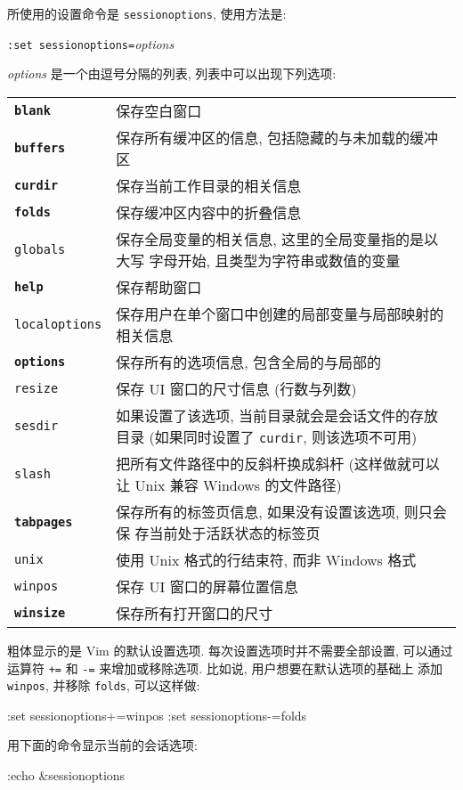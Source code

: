 所使用的设置命令是 \texttt{sessionoptions}, 使用方法是:
\begin{vimcmdform}
\texttt{:set sessionoptions=}\textit{options}
\end{vimcmdform}
\textit{options} 是一个由逗号分隔的列表, 列表中可以出现下列选项:
\begin{center}
    \begin{tabular}{lp{35em}}
        \hline
        \textbf{\texttt{blank}}  & 保存空白窗口 \\
        \textbf{\texttt{buffers}} & 保存所有缓冲区的信息, 包括隐藏的与未加载的缓冲区 \\
        \textbf{\texttt{curdir}} & 保存当前工作目录的相关信息 \\
        \textbf{\texttt{folds}} & 保存缓冲区内容中的折叠信息 \\
        \texttt{globals} & 保存全局变量的相关信息, 这里的全局变量指的是以大写
        字母开始, 且类型为字符串或数值的变量 \\
        \textbf{\texttt{help}} & 保存帮助窗口 \\
        \texttt{localoptions} & 保存用户在单个窗口中创建的局部变量与局部映射的
        相关信息 \\
        \textbf{\texttt{options}} & 保存所有的选项信息, 包含全局的与局部的 \\
        \texttt{resize} & 保存 UI 窗口的尺寸信息 (行数与列数) \\
        \texttt{sesdir} & 如果设置了该选项, 当前目录就会是会话文件的存放目录
        (如果同时设置了 \texttt{curdir}, 则该选项不可用) \\
        \texttt{slash} & 把所有文件路径中的反斜杆换成斜杆 (这样做就可以让 Unix
        兼容 Windows 的文件路径) \\
        \textbf{\texttt{tabpages}} & 保存所有的标签页信息, 如果没有设置该选项, 则只会保
        存当前处于活跃状态的标签页 \\
        \texttt{unix} & 使用 Unix 格式的行结束符, 而非 Windows 格式 \\
        \texttt{winpos} & 保存 UI 窗口的屏幕位置信息 \\
        \textbf{\texttt{winsize}} & 保存所有打开窗口的尺寸 \\
        \hline
    \end{tabular}
\end{center}
粗体显示的是 Vim 的默认设置选项. 每次设置选项时并不需要全部设置, 可以通过运算符
\texttt{+=} 和 \texttt{-=} 来增加或移除选项. 比如说, 用户想要在默认选项的基础上
添加 \texttt{winpos}, 并移除 \texttt{folds}, 可以这样做:
\begin{vimcode}
:set sessionoptions+=winpos
:set sessionoptions-=folds
\end{vimcode}
用下面的命令显示当前的会话选项:
\begin{vimcode}
:echo &sessionoptions
\end{vimcode}

